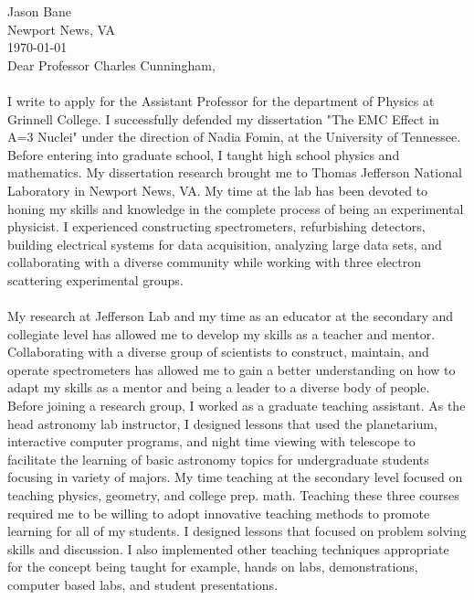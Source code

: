 \documentclass[12pt,letterpaper]{article}
\begin{document}
\vspace*{-1.2cm}
\noindent Jason Bane\\
Newport News, VA \\
\today\\

Dear Professor Charles Cunningham,

\paragraph{}I write to apply for the Assistant Professor for the department of Physics at Grinnell College. I successfully defended my dissertation "The EMC Effect in A=3 Nuclei" under the direction of Nadia Fomin, at the University of Tennessee. Before entering into graduate school, I taught high school physics and mathematics. My dissertation research brought me to Thomas Jefferson National Laboratory in Newport News, VA. My time at the lab has been devoted to honing my skills and knowledge in the complete process of being an experimental physicist. I experienced constructing spectrometers, refurbishing detectors, building electrical systems for data acquisition, analyzing large data sets, and collaborating with a diverse community while working with three electron scattering experimental groups.
\paragraph{}My research at Jefferson Lab and my time as an educator at the secondary and collegiate level has allowed me to develop my skills as a teacher and mentor. Collaborating with a diverse group of scientists to construct, maintain, and operate spectrometers has allowed me to gain a better understanding on how to adapt my skills as a mentor and being a leader to a diverse body of people. Before joining a research group, I worked as a graduate teaching assistant. As the head astronomy lab instructor, I designed lessons that used the planetarium, interactive computer programs, and night time viewing with telescope to facilitate the learning of basic astronomy topics for undergraduate students focusing in variety of majors. My time teaching at the secondary level focused on teaching physics, geometry, and  college prep. math. Teaching these three courses required me to be willing to adopt innovative teaching methods to promote learning for all of my students. I designed lessons that focused on problem solving skills and discussion. I also implemented other teaching techniques appropriate for the concept being taught for example, hands on labs, demonstrations, computer based labs, and student presentations. 
\end{document}
